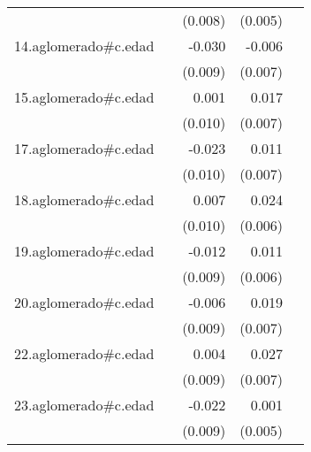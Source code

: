 {\begin{longtable}{l*{4}{D{.}{.}{-1}}}
            &                     &     (0.008)         &     (0.005)         &                     \\
\addlinespace
14.aglomerado#c.edad&                     &      -0.030\sym{***}&      -0.006         &                     \\
            &                     &     (0.009)         &     (0.007)         &                     \\
\addlinespace
15.aglomerado#c.edad&                     &       0.001         &       0.017\sym{*}  &                     \\
            &                     &     (0.010)         &     (0.007)         &                     \\
\addlinespace
17.aglomerado#c.edad&                     &      -0.023\sym{*}  &       0.011         &                     \\
            &                     &     (0.010)         &     (0.007)         &                     \\
\addlinespace
18.aglomerado#c.edad&                     &       0.007         &       0.024\sym{***}&                     \\
            &                     &     (0.010)         &     (0.006)         &                     \\
\addlinespace
19.aglomerado#c.edad&                     &      -0.012         &       0.011         &                     \\
            &                     &     (0.009)         &     (0.006)         &                     \\
\addlinespace
20.aglomerado#c.edad&                     &      -0.006         &       0.019\sym{**} &                     \\
            &                     &     (0.009)         &     (0.007)         &                     \\
\addlinespace
22.aglomerado#c.edad&                     &       0.004         &       0.027\sym{***}&                     \\
            &                     &     (0.009)         &     (0.007)         &                     \\
\addlinespace
23.aglomerado#c.edad&                     &      -0.022\sym{*}  &       0.001         &                     \\
            &                     &     (0.009)         &     (0.005)         &                     \\

\end{longtable}}
